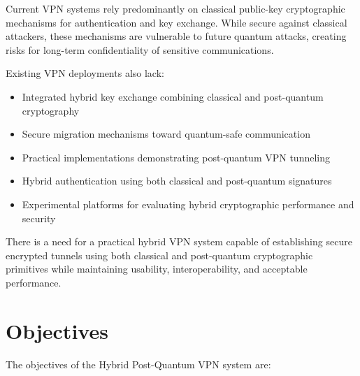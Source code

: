 Current VPN systems rely predominantly on classical public-key cryptographic mechanisms for authentication and key exchange. While secure against classical attackers, these mechanisms are vulnerable to future quantum attacks, creating risks for long-term confidentiality of sensitive communications.

Existing VPN deployments also lack:

\begin{itemize}

    \item Integrated hybrid key exchange combining classical and post-quantum cryptography

    \item Secure migration mechanisms toward quantum-safe communication

    \item Practical implementations demonstrating post-quantum VPN tunneling

    \item Hybrid authentication using both classical and post-quantum signatures

    \item Experimental platforms for evaluating hybrid cryptographic performance and security

\end{itemize}

There is a need for a practical hybrid VPN system capable of establishing secure encrypted tunnels using both classical and post-quantum cryptographic primitives while maintaining usability, interoperability, and acceptable performance.

\section{Objectives}

The objectives of the Hybrid Post-Quantum VPN system are:


